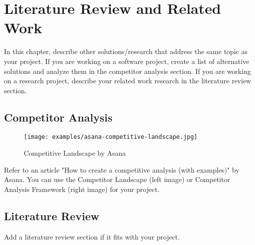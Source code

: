 \chapter{Literature Review and Related Work}
\label{chap:relatedworks}

In this chapter, describe other solutions/research that address the
same topic as your project. If you are working on a software project, create a
list of alternative solutions and analyze them in the competitor analysis section.
If you are working on a research project, describe your related work research in
the literature review section.

\section{Competitor Analysis}
\label{section:competitor-analysis}

\begin{figure}[h]
    \centering
    \texttt{[image: examples/asana-competitive-landscape.jpg]}
    \caption{Competitive Landscape by Asana}
\end{figure}

Refer to an article "How to create a competitive analysis (with
examples)" by Asana. You can use the Competitor Landscape (left image) or
Competitor Analysis Framework (right image) for your project.

\section{Literature Review}
\label{section:literature-review}

Add a literature review section if it fits with your project.